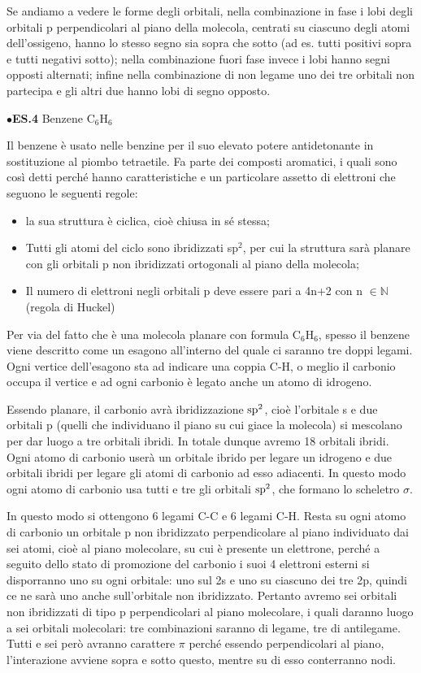 Se andiamo a vedere le forme degli orbitali, nella combinazione in fase i lobi degli orbitali p perpendicolari al piano della molecola, centrati su ciascuno degli atomi dell'ossigeno, hanno lo stesso segno sia sopra che sotto (ad es. tutti positivi sopra e tutti negativi sotto); nella combinazione fuori fase invece i lobi hanno segni opposti alternati; infine nella combinazione di non legame uno dei tre orbitali non partecipa e gli altri due hanno lobi di segno opposto.

\vspace{0.2cm}$\bullet$\textbf{ES.4} Benzene C$_6$H$_6$

Il benzene è usato nelle benzine per il suo elevato potere antidetonante in sostituzione al piombo tetraetile. Fa parte dei composti aromatici, i quali sono così detti perché hanno caratteristiche e un particolare assetto di elettroni che seguono le seguenti regole:

\begin{itemize}
    \item la sua struttura è ciclica, cioè chiusa in sé stessa;
    \item Tutti gli atomi del ciclo sono ibridizzati sp$^2$, per cui la struttura sarà planare con gli orbitali p non ibridizzati ortogonali al piano della molecola;
    \item Il numero di elettroni negli orbitali p deve essere pari a 4n+2 con n $\in \mathbb{N}$ (regola di Huckel)
\end{itemize}

Per via del fatto che è una molecola planare con formula C$_6$H$_6$, spesso il benzene viene descritto come un esagono all'interno del quale ci saranno tre doppi legami. Ogni vertice dell'esagono sta ad indicare una coppia C-H, o meglio il carbonio occupa il vertice e ad ogni carbonio è legato anche un atomo di idrogeno.

Essendo planare, il carbonio avrà ibridizzazione $\rm sp^2$, cioè l'orbitale s e due orbitali p (quelli che individuano il piano su cui giace la molecola) si mescolano per dar luogo a tre orbitali ibridi. In totale dunque avremo 18 orbitali ibridi. Ogni atomo di carbonio userà un orbitale ibrido per legare un idrogeno e due orbitali ibridi per legare gli atomi di carbonio ad esso adiacenti. In questo modo ogni atomo di carbonio usa tutti e tre gli orbitali $\rm sp^2$, che formano lo scheletro $\sigma$.

In questo modo si ottengono 6 legami C-C e 6 legami C-H. Resta su ogni atomo di carbonio un orbitale p non ibridizzato perpendicolare al piano individuato dai sei atomi, cioè al piano molecolare, su cui è presente un elettrone, perché a seguito dello stato di promozione del carbonio i suoi 4 elettroni esterni si disporranno uno su ogni orbitale: uno sul 2s e uno su ciascuno dei tre 2p, quindi ce ne sarà uno anche sull'orbitale non ibridizzato. Pertanto avremo sei orbitali non ibridizzati di tipo p perpendicolari al piano molecolare, i quali daranno luogo a sei orbitali molecolari: tre combinazioni saranno di legame, tre di antilegame. Tutti e sei però avranno carattere $\pi$ perché essendo perpendicolari al piano, l'interazione avviene sopra e sotto questo, mentre su di esso conterranno nodi.

